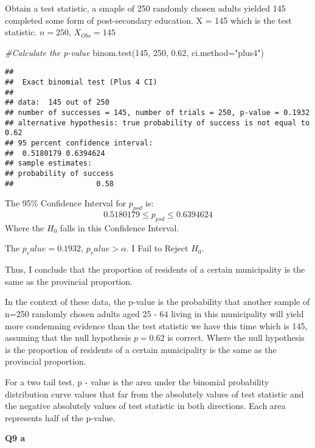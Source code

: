 \documentclass[
]{article}
\newenvironment{Shaded}{\begin{snugshade}}{\end{snugshade}}
\newcommand{\AttributeTok}[1]{\textcolor[rgb]{0.77,0.63,0.00}{#1}}
\newcommand{\CommentTok}[1]{\textcolor[rgb]{0.56,0.35,0.01}{\textit{#1}}}
\newcommand{\DecValTok}[1]{\textcolor[rgb]{0.00,0.00,0.81}{#1}}
\newcommand{\FloatTok}[1]{\textcolor[rgb]{0.00,0.00,0.81}{#1}}
\newcommand{\FunctionTok}[1]{\textcolor[rgb]{0.00,0.00,0.00}{#1}}
\newcommand{\NormalTok}[1]{#1}
\newcommand{\StringTok}[1]{\textcolor[rgb]{0.31,0.60,0.02}{#1}}
\begin{document}
Obtain a test statistic, a smaple of 250 randomly chosen adults yielded
145 completed some form of post-secondary education. X = 145 which is
the test statistic. \(n = 250\), \(X_{Obs} = 145\)

\begin{Shaded}
\begin{Highlighting}[]
\CommentTok{\#Calculate the p{-}value}
\FunctionTok{binom.test}\NormalTok{(}\DecValTok{145}\NormalTok{, }\DecValTok{250}\NormalTok{, }\FloatTok{0.62}\NormalTok{, }\AttributeTok{ci.method=}\StringTok{"plus4"}\NormalTok{)}
\end{Highlighting}
\end{Shaded}

\begin{verbatim}
## 
##  Exact binomial test (Plus 4 CI)
## 
## data:  145 out of 250
## number of successes = 145, number of trials = 250, p-value = 0.1932
## alternative hypothesis: true probability of success is not equal to 0.62
## 95 percent confidence interval:
##  0.5180179 0.6394624
## sample estimates:
## probability of success 
##                   0.58
\end{verbatim}

The 95\% Confidence Interval for \(p_{psd}\) is: \[
0.5180179  \leq p_{psd} \leq 0.6394624
\] Where the \(H_{0}\) falls in this Confidence Interval.

The \(p_value = 0.1932\), \(p_value >\alpha\). I Fail to Reject
\(H_{0}\).

Thus, I conclude that the proportion of residents of a certain
municipality is the same as the provincial proportion.

In the context of these data, the p-value is the probability that
another sample of n=250 randomly chosen adults aged 25 - 64 living in
this municipality will yield more condemning evidence than the test
statistic we have this time which is 145, assuming that the null
hypothesis \(p = 0.62\) is correct. Where the null hypothesis is the
proportion of residents of a certain municipality is the same as the
provincial proportion.

For a two tail test, p - value is the area under the binomial
probability distribution curve values that far from the absolutely
values of test statistic and the negative absolutely values of test
statistic in both directions. Each area represents half of the p-value.

\textbf{Q9 a }
\end{document}
